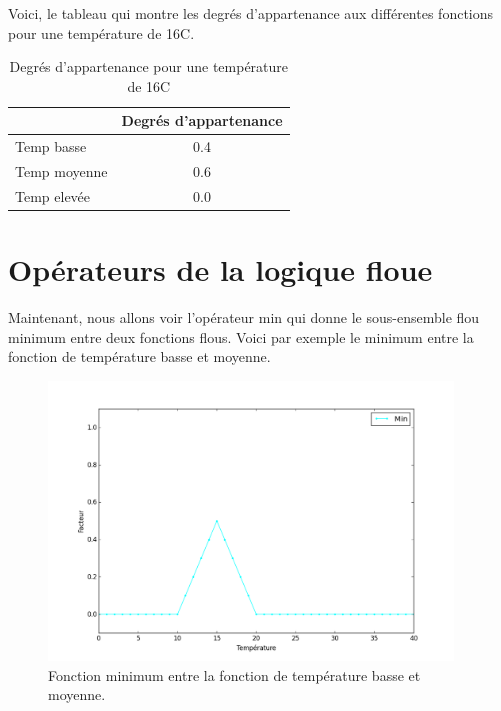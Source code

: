 \documentclass[a4paper,11pt]{article}
\begin{document}
Voici, le tableau qui montre les degrés d'appartenance aux différentes 
fonctions pour une température de 16\degre C.

\begin{table}[H]
  \begin{center}
    \begin{tabular}{|l|c|}
      \hline
       & Degrés d'appartenance \\
      \hline
      \hline
      Temp basse & 0.4 \\
      \hline
      Temp moyenne & 0.6 \\
      \hline
      Temp elevée & 0.0\\
      \hline
    \end{tabular}
    \caption{Degrés d'appartenance pour une température de 16\degre C}
  \end{center}
\end{table}


\newpage

\section{Opérateurs de la logique floue}

Maintenant, nous allons voir l'opérateur min qui donne le sous-ensemble 
flou minimum entre deux fonctions flous. Voici par exemple le 
minimum entre la fonction de température basse et moyenne.

\begin{figure}[H]
  \begin{center}
  \includegraphics[height=280px]{images/min.png}
  \caption{Fonction minimum entre la fonction de température basse et moyenne.}
  \end{center}
\end{figure}
\end{document}
